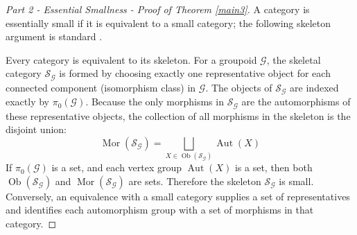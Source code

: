 \documentclass{amsart}
\begin{document}


\begin{proof}[Part 2 - Essential Smallness - Proof of Theorem \ref{main3}]
A category is essentially small if it is equivalent to a small category; the following skeleton argument is standard \cite[Section~IV.4, pp.~93--94]{maclane1998categories}. 

Every category is equivalent to its skeleton. For a groupoid $\mathcal{G}$, the skeletal category $\mathcal{S}_{\mathcal{G}}$ is formed by choosing exactly one representative object for each connected component (isomorphism class) in $\mathcal{G}$. 
The objects of $\mathcal{S}_{\mathcal{G}}$ are indexed exactly by $\pi_0(\mathcal{G})$. 
Because the only morphisms in $\mathcal{S}_{\mathcal{G}}$ are the automorphisms of these representative objects, the collection of all morphisms in the skeleton is the disjoint union:
\begin{equation}
    \operatorname{Mor}(\mathcal{S}_{\mathcal{G}}) = \bigsqcup_{X \in \operatorname{Ob}(\mathcal{S}_{\mathcal{G}})} \operatorname{Aut}(X)
\end{equation}
If $\pi_0(\mathcal{G})$ is a set, and each vertex group $\operatorname{Aut}(X)$ is a set, then both $\operatorname{Ob}(\mathcal{S}_{\mathcal{G}})$ and $\operatorname{Mor}(\mathcal{S}_{\mathcal{G}})$ are sets. Therefore the skeleton $\mathcal S_{\mathcal G}$ is small. Conversely, an equivalence with a small category supplies a set of representatives and identifies each automorphism group with a set of morphisms in that category.
\end{proof}

\end{document}
